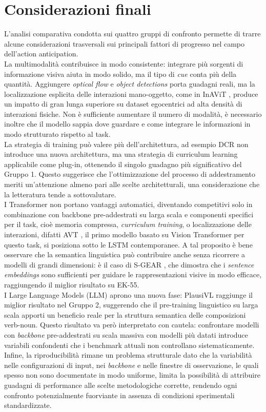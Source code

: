 \section{Considerazioni finali}
L'analisi comparativa condotta sui quattro gruppi di confronto permette di trarre alcune considerazioni trasversali sui principali fattori di progresso nel campo dell'action anticipation.
\\
La multimodalità contribuisce in modo consistente: integrare più sorgenti di informazione visiva aiuta in modo solido, ma il tipo di \textit{cue} conta più della quantità. Aggiungere \textit{optical flow} e \textit{object detections} porta guadagni reali, ma la localizzazione esplicita delle interazioni mano-oggetto, come in InAViT \cite{roy2024interaction}, produce un impatto di gran lunga superiore su dataset egocentrici ad alta densità di interazioni fisiche. Non è sufficiente aumentare il numero di modalità, è necessario inoltre che il modello sappia dove guardare e come integrare le informazioni in modo strutturato rispetto al task.
\\
La strategia di training può valere più dell'architettura, ad esempio DCR \cite{xu2022learning} non introduce una nuova architettura, ma una strategia di curriculum learning applicabile come plug-in, ottenendo il singolo guadagno più significativo del Gruppo 1. Questo suggerisce che l'ottimizzazione del processo di addestramento meriti un'attenzione almeno pari alle scelte architetturali, una considerazione che la letteratura tende a sottovalutare.
\\
I Transformer non portano vantaggi automatici, diventando competitivi solo in combinazione con backbone pre-addestrati su larga scala e componenti specifici per il task, cioè memoria compressa, \textit{curriculum training}, o localizzazione delle interazioni, difatti AVT \cite{girdhar2021anticipative}, il primo modello basato su Vision Transformer per questo task, si posiziona sotto le LSTM contemporanee. 
A tal proposito è bene osservare che la semantica linguistica può contribuire anche senza ricorrere a modelli di grandi dimensioni: è il caso di S-GEAR \cite{diko2024semantically}, che dimostra che i \textit{sentence embeddings} sono sufficienti per guidare le rappresentazioni visive in modo efficace, raggiungendo il miglior risultato su EK-55.
\\
I Large Language Models (LLM) aprono una nuova fase: PlausiVL \cite{mittal2024can} raggiunge il miglior risultato nel Gruppo 2, suggerendo che il pre-training linguistico su larga scala apporti un beneficio reale per la struttura semantica delle composizioni verb-noun. Questo risultato va però interpretato con cautela: confrontare modelli con \textit{backbone} pre-addestrati su scala massiva con modelli più datati introduce variabili confondenti che i benchmark attuali non controllano sistematicamente. 
\\
Infine, la riproducibilità rimane un problema strutturale dato che la variabilità nelle configurazioni di input, nei \textit{backbone} e nelle finestre di osservazione, le quali spesso non sono documentate in modo uniforme, limita la possibilità di attribuire guadagni di performance alle scelte metodologiche corrette, rendendo ogni confronto potenzialmente fuorviante in assenza di condizioni sperimentali standardizzate.
